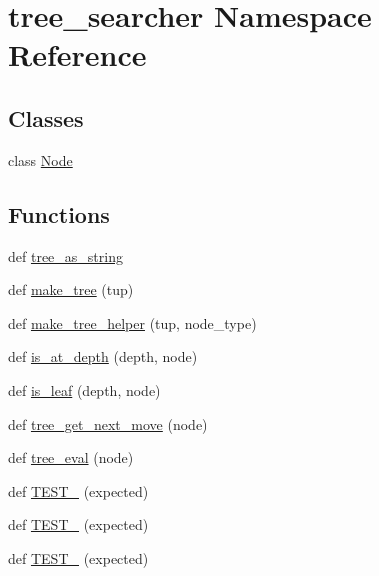 \hypertarget{namespacetree__searcher}{}\section{tree\+\_\+searcher Namespace Reference}
\label{namespacetree__searcher}
\subsection*{Classes}
\begin{DoxyCompactItemize}
\item 
class \hyperlink{classtree__searcher_1_1_node}{Node}
\end{DoxyCompactItemize}
\subsection*{Functions}
\begin{DoxyCompactItemize}
\item 
def \hyperlink{namespacetree__searcher_a40429bd232bf64508d7559f679db0c43}{tree\+\_\+as\+\_\+string}
\item 
def \hyperlink{namespacetree__searcher_ad7aa3b2a8e8a2967ca966399c95c9401}{make\+\_\+tree} (tup)
\item 
def \hyperlink{namespacetree__searcher_add6d93a6d7b1ca1fc2ba6b8003cbbdfc}{make\+\_\+tree\+\_\+helper} (tup, node\+\_\+type)
\item 
def \hyperlink{namespacetree__searcher_aef6b1c7f075dfa18d1e49cf00b13760b}{is\+\_\+at\+\_\+depth} (depth, node)
\item 
def \hyperlink{namespacetree__searcher_a33493ef1557aa857dd530e280f4153a8}{is\+\_\+leaf} (depth, node)
\item 
def \hyperlink{namespacetree__searcher_ac2042e0c041ed68a4fd9fd4377afbee4}{tree\+\_\+get\+\_\+next\+\_\+move} (node)
\item 
def \hyperlink{namespacetree__searcher_a0de4d6482e8f62561944e5f9b2cf7047}{tree\+\_\+eval} (node)
\item 
def \hyperlink{namespacetree__searcher_a1b3b90d379cc3db6e9d0dedd3ba40264}{T\+E\+S\+T\+\_} (expected)
\item 
def \hyperlink{namespacetree__searcher_a977851e09f5b46a5710d065d8f342d39}{T\+E\+S\+T\+\_} (expected)
\item 
def \hyperlink{namespacetree__searcher_a22d3d902139be0cd38cec908adfefdcb}{T\+E\+S\+T\+\_} (expected)
\end{DoxyCompactItemize}


